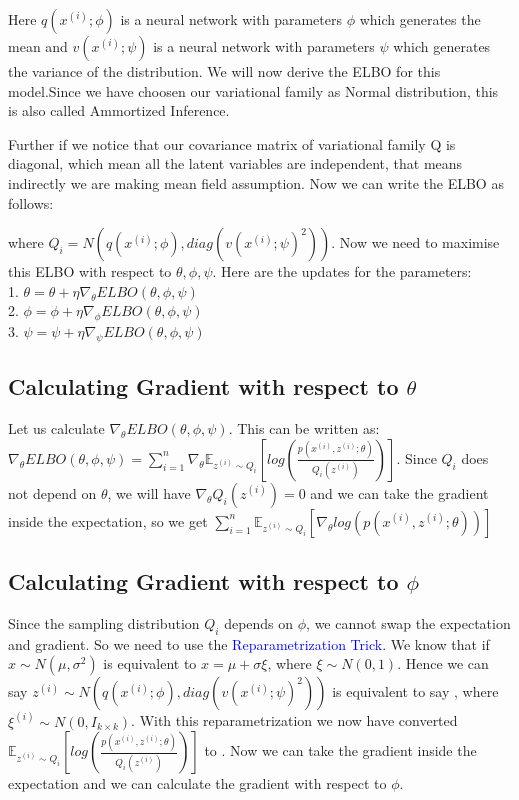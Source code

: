 \documentclass[10pt,a4paper,twoside]{tau-book}
\begin{document}
Here $q(x^{(i)};\phi)$ is a neural network with parameters $\phi$ which generates the mean and $v(x^{(i)};\psi)$ is a neural network with parameters $\psi$ which generates the variance of the distribution. We will now derive the ELBO for this model.Since we have choosen our variational family as Normal distribution, this is also called Ammortized Inference.

Further if we notice that our covariance matrix of variational family Q is diagonal, which mean all the latent variables are independent, that means indirectly we are making mean field assumption. Now we can write the ELBO as follows:

 where $Q_i = N(q(x^{(i)};\phi), diag(v(x^{(i)};\psi)^2))$. Now we need to maximise this ELBO with respect to $\theta,\phi,\psi$. Here are the updates for the parameters:\\
1. $\theta = \theta + \eta \nabla_{\theta} ELBO(\theta,\phi,\psi)$\\
2. $\phi = \phi + \eta \nabla_{\phi} ELBO(\theta,\phi,\psi)$\\
3. $\psi = \psi + \eta \nabla_{\psi} ELBO(\theta,\phi,\psi)$

\subsection{Calculating Gradient with respect to $\theta$}
Let us calculate $\nabla_{\theta} ELBO(\theta,\phi,\psi)$. This can be written as: $\nabla_{\theta} ELBO(\theta,\phi,\psi) = \sum_{i=1}^{n} \nabla_{\theta} \mathbb{E}_{z^{(i)} \sim Q_i} [log(\frac{p(x^{(i)},z^{(i)};\theta)}{Q_i(z^{(i)})})]$. Since $Q_i$ does not depend on $\theta$, we will have $\nabla_{\theta} Q_i(z^{(i)}) = 0$ and we can take the gradient inside the expectation, so we get $\sum_{i=1}^{n} \mathbb{E}_{z^{(i)} \sim Q_i} [\nabla_{\theta} log(p(x^{(i)}, z^{(i)};\theta))]$ 

\subsection{Calculating Gradient with respect to $\phi$}
Since the sampling distribution $Q_i$ depends on $\phi$, we cannot swap the expectation and gradient. So we need to use the \textcolor{blue}{Reparametrization Trick}. We know that if $x \sim N(\mu,\sigma^2)$ is equivalent to $x = \mu + \sigma\xi$, where $\xi \sim N(0,1)$. Hence we can say $z^{(i)} \sim N(q(x^{(i)};\phi), diag(v(x^{(i)};\psi)^2))$  is equivalent to say , where $\xi^{(i)} \sim N(0,I_{k \times k})$. With this reparametrization we now have converted  $\mathbb{E}_{z^{(i)} \sim Q_i}[log(\frac{p(x^{(i)},z^{(i)};\theta)}{Q_i(z^{(i)})})]$ to . Now we can take the gradient inside the expectation and we can calculate the gradient with respect to $\phi$.
\end{document}
